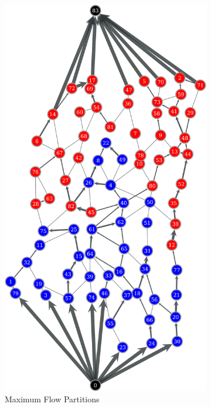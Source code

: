 \documentclass[titlepage]{article}
\begin{document}
\begin{figure}
      \begin{subfigure}[b]{0.5\textwidth}
        \center
        \includegraphics[width=\textwidth]{figures/maxflow_directed-crop.pdf}
        \caption{Maximum Flow Partitions}
        \label{fig:newmaxflow}
      \end{subfigure}
      \caption{}
    \end{figure}
\end{document}
